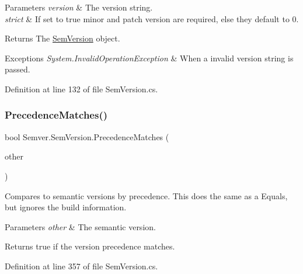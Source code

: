 \begin{DoxyParams}{Parameters}
{\em version} & The version string.\\
\hline
{\em strict} & If set to {\ttfamily true} minor and patch version are required, else they default to 0.\\
\hline
\end{DoxyParams}
\begin{DoxyReturn}{Returns}
The \mbox{\hyperlink{class_semver_1_1_sem_version}{Sem\+Version}} object.
\end{DoxyReturn}

\begin{DoxyExceptions}{Exceptions}
{\em System.\+Invalid\+Operation\+Exception} & When a invalid version string is passed.\\
\hline
\end{DoxyExceptions}


Definition at line 132 of file Sem\+Version.\+cs.

\mbox{\label{class_semver_1_1_sem_version_a8a4c9fdc124a640e26a9d81e6b6ea257}} 
\subsubsection{\texorpdfstring{PrecedenceMatches()}{PrecedenceMatches()}}
{\footnotesize\ttfamily bool Semver.\+Sem\+Version.\+Precedence\+Matches (\begin{DoxyParamCaption}\item[{\mbox{\hyperlink{class_semver_1_1_sem_version}{Sem\+Version}}}]{other }\end{DoxyParamCaption})}



Compares to semantic versions by precedence. This does the same as a Equals, but ignores the build information. 


\begin{DoxyParams}{Parameters}
{\em other} & The semantic version.\\
\hline
\end{DoxyParams}
\begin{DoxyReturn}{Returns}
{\ttfamily true} if the version precedence matches.
\end{DoxyReturn}


Definition at line 357 of file Sem\+Version.\+cs.

